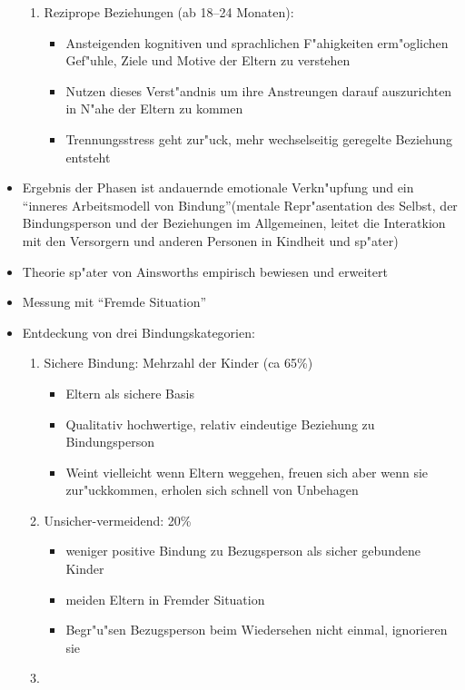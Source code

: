 \begin{itemize}
\begin{enumerate}
			\item
				Reziprope Beziehungen (ab 18--24 Monaten):
				\begin{itemize}
					\item
						Ansteigenden kognitiven und sprachlichen F"ahigkeiten erm"oglichen Gef"uhle, Ziele und Motive der Eltern zu verstehen
					\item
						Nutzen dieses Verst"andnis um ihre Anstreungen darauf auszurichten in N"ahe der Eltern zu kommen
					\item
						Trennungsstress geht zur"uck, mehr wechselseitig geregelte Beziehung entsteht
				\end{itemize}
		\end{enumerate}
	\item
		Ergebnis der Phasen ist andauernde emotionale Verkn"upfung und ein \enquote{inneres Arbeitsmodell von Bindung}(mentale Repr"asentation des Selbst, der Bindungsperson und der Beziehungen im Allgemeinen, leitet die Interatkion mit den Versorgern und anderen Personen in Kindheit und sp"ater)
	\item
		Theorie sp"ater von Ainsworths empirisch bewiesen und erweitert
	\item
		Messung mit \enquote{Fremde Situation}
	\item
		Entdeckung von drei Bindungskategorien:
		\begin{enumerate}
			\item
				Sichere Bindung: Mehrzahl der Kinder (ca 65\%)
				\begin{itemize}
					\item
						Eltern als sichere Basis
					\item
						Qualitativ hochwertige, relativ eindeutige Beziehung zu Bindungsperson
					\item
						Weint vielleicht wenn Eltern weggehen, freuen sich aber wenn sie zur"uckkommen, erholen sich schnell von Unbehagen
				\end{itemize}
			\item
				Unsicher-vermeidend: 20\%
				\begin{itemize}
					\item
						weniger positive Bindung zu Bezugsperson als sicher gebundene Kinder
					\item
						meiden Eltern in Fremder Situation
					\item
						Begr"u"sen Bezugsperson beim Wiedersehen nicht einmal, ignorieren sie
				\end{itemize}
			\item

\end{enumerate}
\end{itemize}
